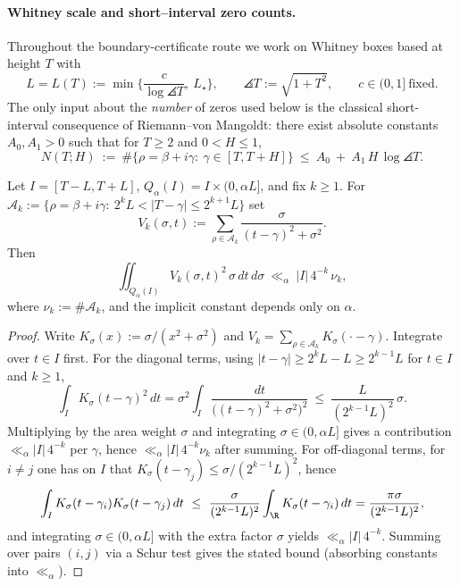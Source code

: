 \paragraph{Whitney scale and short--interval zero counts.}
Throughout the boundary-certificate route we work on Whitney boxes based at height \(T\) with
\[
  L=L(T):=\min\Big\{\frac{c}{\log\angles{T}},\ L_\star\Big\},\qquad
  \angles{T}:=\sqrt{1+T^2},\qquad c\in(0,1]\ \text{fixed}.
\]
The only input about the \emph{number} of zeros used below is the classical short-interval consequence of Riemann--von Mangoldt: there exist absolute constants \(A_0,A_1>0\) such that for \(T\ge 2\) and \(0<H\le 1\),
\[
  N(T;H)\ :=\ \#\{\rho=\beta+i\gamma:\ \gamma\in[T,T+H]\}\ \le\ A_0\ +\ A_1\,H\,\log\angles{T}.
\]

\begin{lemma}\label{lem:annular-balayage}
Let \(I=[T-L,T+L]\), \(Q_\alpha(I)=I\times(0,\alpha L]\), and fix \(k\ge 1\).
For
\(
\mathcal A_k:=\{\rho=\beta+i\gamma:\ 2^kL<|T-\gamma|\le 2^{k+1}L\}
\)
set
\[
  V_k(\sigma,t):=\sum_{\rho\in\mathcal A_k}\frac{\sigma}{(t-\gamma)^2+\sigma^2}.
\]
Then
\[
  \iint_{Q_\alpha(I)} V_k(\sigma,t)^2\,\sigma\,dt\,d\sigma\ \ll_\alpha\ |I|\,4^{-k}\,\nu_k,
\]
where \(\nu_k:=\#\mathcal A_k\), and the implicit constant depends only on \(\alpha\).
\end{lemma}
\begin{proof}
Write \(K_\sigma(x):=\sigma/(x^2+\sigma^2)\) and \(V_k=\sum_{\rho\in\mathcal A_k}K_\sigma(\cdot-\gamma)\).
Integrate over \(t\in I\) first.
For the diagonal terms, using \(|t-\gamma|\ge 2^kL-L\ge 2^{k-1}L\) for \(t\in I\) and \(k\ge 1\),
\[
 \int_I K_\sigma(t-\gamma)^2\,dt
 = \sigma^2\!\int_I \frac{dt}{\big((t-\gamma)^2+\sigma^2\big)^2}
 \ \le\ \frac{L}{(2^{k-1}L)^2}\,\sigma.
\]
Multiplying by the area weight \(\sigma\) and integrating \(\sigma\in(0,\alpha L]\) gives a contribution \(\ll_\alpha |I|\,4^{-k}\) per \(\gamma\), hence \(\ll_\alpha |I|\,4^{-k}\nu_k\) after summing.
For off-diagonal terms, for \(i\ne j\) one has on \(I\) that \(K_\sigma(t-\gamma_j)\le \sigma/(2^{k-1}L)^2\), hence
\[
 \int_I K_\sigma(t-\gamma_i)K_\sigma(t-\gamma_j)\,dt
 \ \le\ \frac{\sigma}{(2^{k-1}L)^2}\int_\R K_\sigma(t-\gamma_i)\,dt
 = \frac{\pi\sigma}{(2^{k-1}L)^2},
\]
and integrating \(\sigma\in(0,\alpha L]\) with the extra factor \(\sigma\) yields \(\ll_\alpha |I|\,4^{-k}\).
Summing over pairs \((i,j)\) via a Schur test gives the stated bound (absorbing constants into \(\ll_\alpha\)).
\end{proof}

